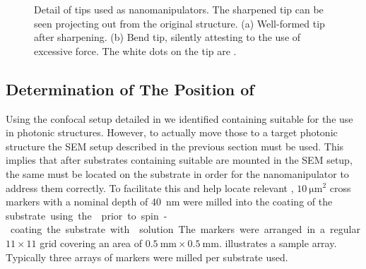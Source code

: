 \begin{figure}[!htb]
\begin{subfigure}[t]{ 0.49\linewidth}
				\caption{}
				\label{subfig::nanomanipulator_tip_bent}
			\end{subfigure}
			\caption[Detail of nanomanipulator tips]{Detail of tips used as nanomanipulators. The sharpened tip can be seen projecting out from the original structure. (a) Well-formed tip after sharpening. (b) Bend tip, silently attesting to the use of excessive force. The white dots on the tip are \nds.}
		\end{figure}

	\subsection{Determination of The Position of \Nds} \label{subsec::position}

		Using the confocal setup detailed in  we identified \nds containing \sivs suitable for the use in photonic structures. However, to actually move those \nds to a target photonic structure the SEM setup described in the previous section must be used. This implies that after substrates containing suitable \nds are mounted in the SEM setup, the same \nds must be located on the substrate in order for the nanomanipulator to address them correctly.
		To facilitate this and help locate relevant \nds, $\SI{10}{\micro\meter\squared}$ cross markers with a nominal depth of \SI{40}{\nm} were milled into the \ir coating of the \si substrate using the \fib prior to spin-coating the substrate with \nd solution. The markers were arranged in a regular $11 \times 11$ grid covering an area of $\SI{0.5}{\milli\meter} \times \SI{0.5}{\milli\meter}$.  illustrates a sample array. Typically three arrays of markers were milled per substrate used.

